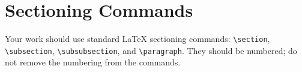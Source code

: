 \documentclass[
]{ceurart}
\begin{document}







\section{Sectioning Commands}

Your work should use standard \LaTeX{} sectioning commands:
\verb|\section|, \verb|\subsection|,
\verb|\subsubsection|, and
\verb|\paragraph|. They should be numbered; do not remove
the numbering from the commands.
\end{document}
